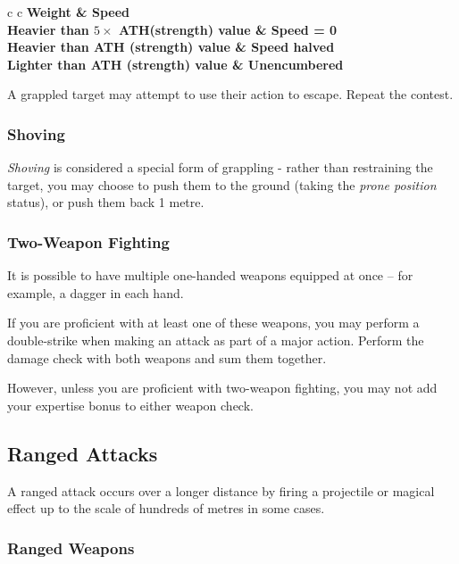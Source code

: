\begin{center}
\begin{rndtable}{c c}
\bf Weight	&	\bf Speed
\\
Heavier than $ 5 \times$ ATH(strength) value	&	Speed = 0
\\
Heavier than ATH (strength) value	&	Speed halved
\\
Lighter than ATH (strength) value & Unencumbered
\end{rndtable}
\end{center}

A grappled target may attempt to use their action to escape. Repeat the contest. 

\subsubsection{Shoving}

{\it Shoving} is considered a special form of grappling - rather than restraining the target, you may choose to push them to the ground (taking the {\it prone position} status), or push them back 1 metre. 

\subsubsection{Two-Weapon Fighting}

It is possible to have multiple one-handed weapons equipped at once -- for example, a dagger in each hand. 

If you are proficient with at least one of these weapons, you may perform a double-strike when making an attack as part of a major action. Perform the damage check with both weapons and sum them together. 

However, unless you are proficient with two-weapon fighting, you may not add your expertise bonus to either weapon check. 

\subsection{Ranged Attacks}

A ranged attack occurs over a longer distance by firing a projectile or magical effect up to the scale of hundreds of metres in some cases. 

\subsubsection{Ranged Weapons}

